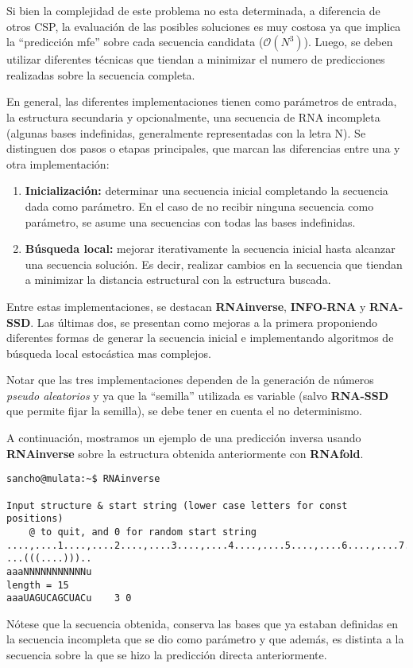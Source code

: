 Si bien la complejidad de este problema no esta determinada, a diferencia de
otros \ac{CSP}, la evaluaci\'on de las posibles soluciones es muy costosa ya que
implica la ``predicci\'on \ac{mfe}'' sobre cada secuencia candidata
($\mathcal{O}(N^{3})$). Luego, se deben utilizar diferentes t\'ecnicas que
tiendan a minimizar el numero de predicciones realizadas sobre la secuencia
completa.

En general, las diferentes implementaciones tienen como par\'ametros de
entrada, la estructura secundaria y opcionalmente, una secuencia de \ac{RNA}
incompleta (algunas bases indefinidas, generalmente representadas con la
letra N). Se distinguen dos pasos o etapas principales, que marcan las
diferencias entre una y otra implementaci\'on:
\begin{enumerate}
 \item \textbf{Inicializaci\'on:} determinar una secuencia inicial completando
la secuencia dada como par\'ametro. En el caso de no recibir ninguna secuencia
como par\'ametro, se asume una secuencias con todas las bases indefinidas.
 \item \textbf{B\'usqueda local:} mejorar iterativamente la secuencia inicial
hasta alcanzar una secuencia soluci\'on. Es decir, realizar cambios en la
secuencia que tiendan a minimizar la distancia estructural con la estructura
buscada.
\end{enumerate}

Entre estas implementaciones, se destacan \textbf{RNAinverse}\cite{Hofacker94},
\textbf{INFO-RNA}\cite{Busch07} y \textbf{RNA-SSD}\cite{Andronescu03}. Las
\'ultimas dos, se presentan como mejoras a la primera proponiendo diferentes
formas de generar la secuencia inicial e implementando algoritmos de b\'usqueda
local estoc\'astica mas complejos.

Notar que las tres implementaciones dependen de la generaci\'on de n\'umeros
\textit{pseudo aleatorios} y ya que la ``semilla'' utilizada es variable (salvo
\textbf{RNA-SSD} que permite fijar la semilla), se debe tener en cuenta el no
determinismo.

A continuaci\'on, mostramos un ejemplo de una predicci\'on inversa usando
\textbf{RNAinverse} sobre la estructura obtenida anteriormente con
\textbf{RNAfold}.

\begin{verbatim}
sancho@mulata:~$ RNAinverse 

Input structure & start string (lower case letters for const positions)
    @ to quit, and 0 for random start string
....,....1....,....2....,....3....,....4....,....5....,....6....,....7....,....8
...(((....)))..
aaaNNNNNNNNNNNu
length = 15
aaaUAGUCAGCUACu    3 0
\end{verbatim}

N\'otese que la secuencia obtenida, conserva las bases que ya estaban definidas
en la secuencia incompleta que se dio como par\'ametro y que adem\'as, es
distinta a la secuencia sobre la que se hizo la predicci\'on directa
anteriormente.
